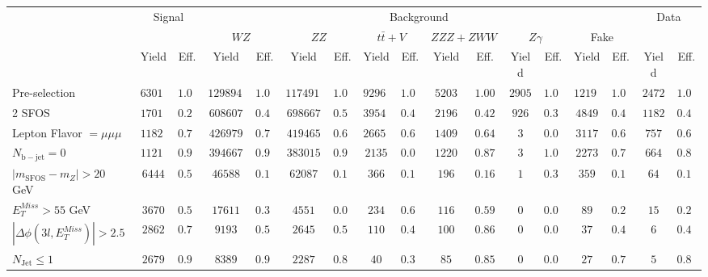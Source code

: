 \begin{tabular}{l||c|c||c|c||c|c||c|c||c|c||c|c||c|c||c|c}
\hline
 &                 \multicolumn{2}{c||}{Signal}            &  \multicolumn{12}{c||}{Background} &  \multicolumn{2}{c}{Data} \\
 & &  & \multicolumn{2}{c||}{$WZ$} & \multicolumn{2}{c||}{$ZZ$} & \multicolumn{2}{c||}{$t\bar{t}+V$} & \multicolumn{2}{c||}{$ZZZ+ZWW$} & \multicolumn{2}{c||}{$Z\gamma$} & \multicolumn{2}{c||}{Fake} &  & \\ 
 & Yield & Eff. & Yield & Eff. & Yield & Eff. & Yield & Eff. & Yield & Eff. & Yield & Eff. & Yield & Eff. & Yield & Eff.\\
\hline\hline
Pre-selection &  $63019$ &  $1.00$ &  $1298941$ &  $1.00$ &  $1174916$ &  $1.00$ &  $92968$ &  $1.00$ &  $5203$ &  $1.00$ &  $2905$ &  $1.00$ &  $12192$ &  $1.00$ &  $2472$ &  $1.00$\\ 
\hline
2 SFOS &  $17014$ &  $0.27$ &  $608607$ &  $0.47$ &  $698667$ &  $0.59$ &  $39546$ &  $0.43$ &  $2196$ &  $0.42$ &  $926$ &  $0.32$ &  $4849$ &  $0.40$ &  $1182$ &  $0.48$\\ 
\hline
Lepton Flavor $= \mu\mu\mu$ &  $11827$ &  $0.70$ &  $426979$ &  $0.70$ &  $419465$ &  $0.60$ &  $26653$ &  $0.67$ &  $1409$ &  $0.64$ &  $3$ &  $0.00$ &  $3117$ &  $0.64$ &  $757$ &  $0.64$\\ 
\hline
$N_{\mathrm{b-jet}}=0$ &  $11216$ &  $0.95$ &  $394667$ &  $0.92$ &  $383015$ &  $0.91$ &  $2135$ &  $0.08$ &  $1220$ &  $0.87$ &  $3$ &  $1.00$ &  $2273$ &  $0.73$ &  $664$ &  $0.88$\\ 
\hline
$| m_{\mathrm{SFOS}} - m_Z | >  20$ GeV &  $6444$ &  $0.57$ &  $46588$ &  $0.12$ &  $62087$ &  $0.16$ &  $366$ &  $0.17$ &  $196$ &  $0.16$ &  $1$ &  $0.33$ &  $359$ &  $0.16$ &  $64$ &  $0.10$\\ 
\hline
$E_{T}^{Miss} > 55$ GeV &  $3670$ &  $0.57$ &  $17611$ &  $0.38$ &  $4551$ &  $0.07$ &  $234$ &  $0.64$ &  $116$ &  $0.59$ &  $0$ &  $0.00$ &  $89$ &  $0.25$ &  $15$ &  $0.23$\\ 
\hline
$|\Delta\phi(3l,E_{T}^{Miss})| > 2.5$ &  $2862$ &  $0.78$ &  $9193$ &  $0.52$ &  $2645$ &  $0.58$ &  $110$ &  $0.47$ &  $100$ &  $0.86$ &  $0$ &  $0.00$ &  $37$ &  $0.42$ &  $6$ &  $0.40$\\ 
\hline
$N_{\mathrm{Jet}} \leq 1$ &  $2679$ &  $0.94$ &  $8389$ &  $0.91$ &  $2287$ &  $0.86$ &  $40$ &  $0.36$ &  $85$ &  $0.85$ &  $0$ &  $0.00$ &  $27$ &  $0.73$ &  $5$ &  $0.83$\\ 
\hline
\end{tabular}
